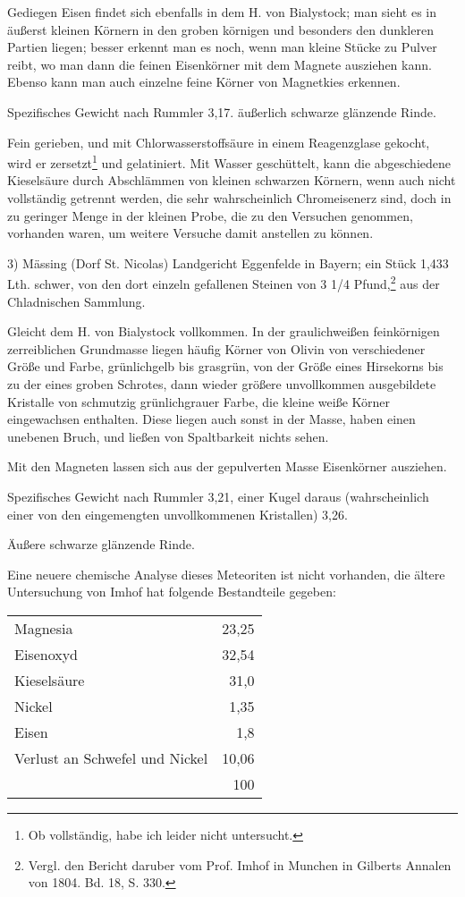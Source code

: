 \documentclass[a4paper, 11pt, oneside]{article}
\begin{document}
Gediegen Eisen findet sich ebenfalls in dem H. von Bialystock; man sieht es in äußerst kleinen Körnern in den groben körnigen und besonders den dunkleren Partien liegen; besser erkennt man es noch, wenn man kleine Stücke zu Pulver reibt, wo man dann die feinen Eisenkörner mit dem Magnete ausziehen kann. Ebenso kann man auch einzelne feine Körner von Magnetkies erkennen.

Spezifisches Gewicht nach Rummler 3,17. äußerlich schwarze glänzende Rinde.

Fein gerieben, und mit Chlorwasserstoffsäure in einem Reagenzglase gekocht, wird er zersetzt\footnote{Ob vollständig, habe ich leider nicht untersucht.} und gelatiniert. Mit Wasser geschüttelt, kann die abgeschiedene Kieselsäure durch Abschlämmen von kleinen schwarzen Körnern, wenn auch nicht vollständig getrennt werden, die sehr wahrscheinlich Chromeisenerz sind, doch in zu geringer Menge in der kleinen Probe, die zu den Versuchen genommen, vorhanden waren, um weitere Versuche damit anstellen zu können.

3) Mässing (Dorf St. Nicolas) Landgericht Eggenfelde in Bayern; ein Stück 1,433 Lth. schwer, von den dort einzeln gefallenen Steinen von 3 1/4 Pfund,\footnote{Vergl. den Bericht daruber vom Prof. Imhof in Munchen in Gilberts Annalen von 1804. Bd. 18, S. 330.} aus der Chladnischen Sammlung.

Gleicht dem H. von Bialystock vollkommen. In der graulichweißen feinkörnigen zerreiblichen Grundmasse liegen häufig Körner von Olivin von verschiedener Größe und Farbe, grünlichgelb bis grasgrün, von der Größe eines Hirsekorns bis zu der eines groben Schrotes, dann wieder größere unvollkommen ausgebildete Kristalle von schmutzig grünlichgrauer Farbe, die kleine weiße Körner eingewachsen enthalten. Diese liegen auch sonst in der Masse, haben einen unebenen Bruch, und ließen von Spaltbarkeit nichts sehen.

Mit den Magneten lassen sich aus der gepulverten Masse Eisenkörner ausziehen.

Spezifisches Gewicht nach Rummler 3,21, einer Kugel daraus (wahrscheinlich einer von den eingemengten unvollkommenen Kristallen) 3,26.

Äußere schwarze glänzende Rinde.

Eine neuere chemische Analyse dieses Meteoriten ist nicht vorhanden, die ältere Untersuchung von Imhof hat folgende Bestandteile gegeben:
\begin{center}
\begin{tabular}{ l r }
    Magnesia & 23,25\\
    Eisenoxyd & 32,54\\
    Kieselsäure & 31,0\\
    Nickel & 1,35\\
    Eisen & 1,8\\
    Verlust an Schwefel und Nickel & 10,06\\
     & 100\\  
\end{tabular}
\end{center}
\end{document}
